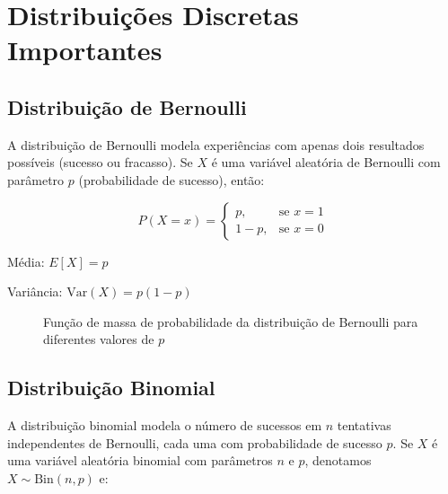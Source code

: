 \documentclass[a4paper,12pt]{article}
\begin{document}
\section{Distribuições Discretas Importantes}

\subsection{Distribuição de Bernoulli}

A distribuição de Bernoulli modela experiências com apenas dois resultados possíveis (sucesso ou fracasso). Se $X$ é uma variável aleatória de Bernoulli com parâmetro $p$ (probabilidade de sucesso), então:

\begin{equation}
P(X = x) = 
\begin{cases}
p, & \text{se } x = 1 \\
1-p, & \text{se } x = 0
\end{cases}
\end{equation}

Média: $E[X] = p$

Variância: $\text{Var}(X) = p(1-p)$

\begin{figure}[H]
\centering
{}
\caption{Função de massa de probabilidade da distribuição de Bernoulli para diferentes valores de $p$}
\end{figure}

\subsection{Distribuição Binomial}

A distribuição binomial modela o número de sucessos em $n$ tentativas independentes de Bernoulli, cada uma com probabilidade de sucesso $p$. Se $X$ é uma variável aleatória binomial com parâmetros $n$ e $p$, denotamos $X \sim \text{Bin}(n, p)$ e:
\end{document}
